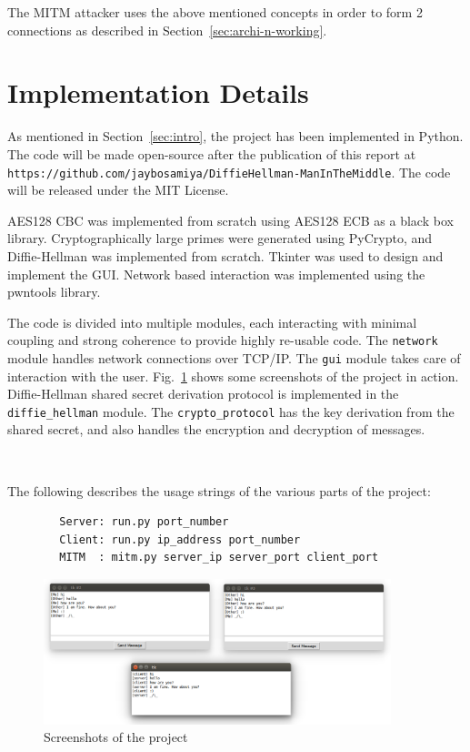 \documentclass[12pt,a4paper]{article}
\begin{document}
The MITM attacker uses the above mentioned concepts in order to form 2 connections as described in Section~\ref{sec:archi-n-working}.

\section{Implementation Details}
\label{sec:implementation}


As mentioned in Section~\ref{sec:intro}, the project has been implemented in Python. The code will be made open-source after the publication of this report at \verb|https://github.com/jaybosamiya/DiffieHellman-ManInTheMiddle|. The code will be released under the MIT License.

AES128 CBC was implemented from scratch using AES128 ECB as a black box library. Cryptographically large primes were generated using PyCrypto, and Diffie-Hellman was implemented from scratch. Tkinter was used to design and implement the GUI. Network based interaction was implemented using the pwntools library.

The code is divided into multiple modules, each interacting with minimal coupling and strong coherence to provide highly re-usable code. The \verb|network| module handles network connections over TCP/IP. The \verb|gui| module takes care of interaction with the user. Fig.~\ref{fig:screenshots} shows some screenshots of the project in action. Diffie-Hellman shared secret derivation protocol is implemented in the \verb|diffie_hellman| module. The \verb|crypto_protocol| has the key derivation from the shared secret, and also handles the encryption and decryption of messages.

~

\noindent
The following describes the usage strings of the various parts of the project:
\begin{verbatim}
	    Server: run.py port_number
	    Client: run.py ip_address port_number
	    MITM  : mitm.py server_ip server_port client_port
\end{verbatim}

\begin{figure}[h]
	\centering
	\vspace{0.5cm}
	\includegraphics[width=0.9\textwidth]{pictures/screenshot}
	\vspace{0.5cm}
	\caption{Screenshots of the project}
	\label{fig:screenshots}
\end{figure}
\end{document}

